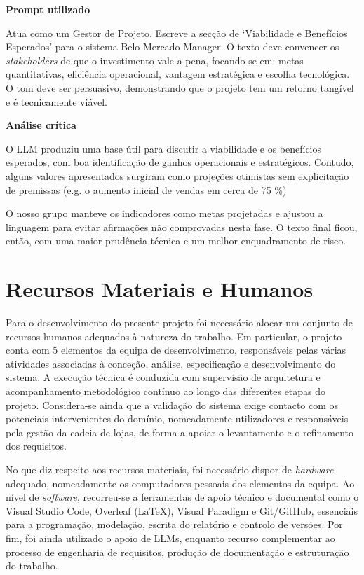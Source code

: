     \begin{tcolorbox}[title=Interação com o LLM]
    \textbf{Prompt utilizado}

    Atua como um Gestor de Projeto. Escreve a secção de `Viabilidade e Benefícios Esperados' para o sistema Belo Mercado Manager. O texto deve convencer os \textit{stakeholders} de que o investimento vale a pena, focando-se em: metas quantitativas, eficiência operacional, vantagem estratégica e escolha tecnológica. O tom deve ser persuasivo, demonstrando que o projeto tem um retorno tangível e é tecnicamente viável.

    \tcblower

    \textbf{Análise crítica}

    O LLM produziu uma base útil para discutir a viabilidade e os benefícios esperados, com boa identificação de ganhos operacionais e estratégicos. Contudo, alguns valores apresentados surgiram como projeções otimistas sem explicitação de premissas (e.g. o aumento inicial de vendas em cerca de 75 \%)

    O nosso grupo manteve os indicadores como metas projetadas e ajustou a linguagem para evitar afirmações não comprovadas nesta fase. O texto final ficou, então, com uma maior prudência técnica e um melhor enquadramento de risco.
    \end{tcolorbox}

\section{Recursos Materiais e Humanos}

    Para o desenvolvimento do presente projeto foi necessário alocar um conjunto de recursos humanos adequados à natureza do trabalho. Em particular, o projeto conta com 5 elementos da equipa de desenvolvimento, responsáveis pelas várias atividades associadas à conceção, análise, especificação e desenvolvimento do sistema. A execução técnica é conduzida com supervisão de arquitetura e acompanhamento metodológico contínuo ao longo das diferentes etapas do projeto. Considera-se ainda que a validação do sistema exige contacto com os potenciais intervenientes do domínio, nomeadamente utilizadores e responsáveis pela gestão da cadeia de lojas, de forma a apoiar o levantamento e o refinamento dos requisitos.

    No que diz respeito aos recursos materiais, foi necessário dispor de \textit{hardware} adequado, nomeadamente os computadores pessoais dos elementos da equipa. Ao nível de \textit{software}, recorreu-se a ferramentas de apoio técnico e documental como o Visual Studio Code, Overleaf (LaTeX), Visual Paradigm e Git/GitHub, essenciais para a programação, modelação, escrita do relatório e controlo de versões. Por fim, foi ainda utilizado o apoio de LLMs, enquanto recurso complementar ao processo de engenharia de requisitos, produção de documentação e estruturação do trabalho.


